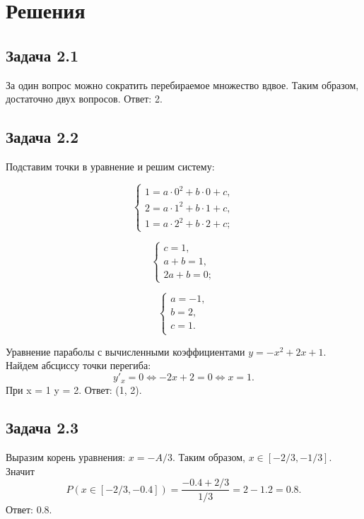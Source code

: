 \documentclass[12pt]{article}
\begin{document}
\section*{Решения}

\subsection*{Задача 2.1}
За один вопрос можно сократить перебираемое множество вдвое. Таким образом, достаточно двух вопросов. Ответ: 2.

\subsection*{Задача 2.2}
Подставим точки в уравнение и решим систему:

\begin{equation*} 
    \begin{cases}
    1 = a\cdot 0^2 + b\cdot 0 + c,\\
    2 = a\cdot 1^2 + b\cdot 1 + c,\\
    1 = a\cdot 2^2 + b\cdot 2 + c;
    \end{cases}
\end{equation*}

\begin{equation*} 
    \begin{cases}
    c = 1,\\
    a + b = 1,\\
    2a + b = 0;
    \end{cases}
\end{equation*}

\begin{equation*} 
    \begin{cases}
        a = -1,\\
        b = 2, \\
        c = 1. \\
    \end{cases}
\end{equation*}

Уравнение параболы с вычисленными коэффициентами $y = -x^2 + 2x + 1$. Найдем абсциссу точки перегиба: 
$$y'_x=0 \Leftrightarrow -2x + 2 = 0 \Leftrightarrow x = 1. $$
При x = 1 y = 2. Ответ: (1, 2).

\subsection*{Задача 2.3}
Выразим корень уравнения: $x = -A/3$. Таким образом, $x \in [-2/3, -1/3]$. Значит $$P(x \in [-2/3, -0.4]) = \frac{-0.4+2/3}{1/3} = 2 - 1.2 = 0.8.$$ Ответ: 0.8.
\end{document}
